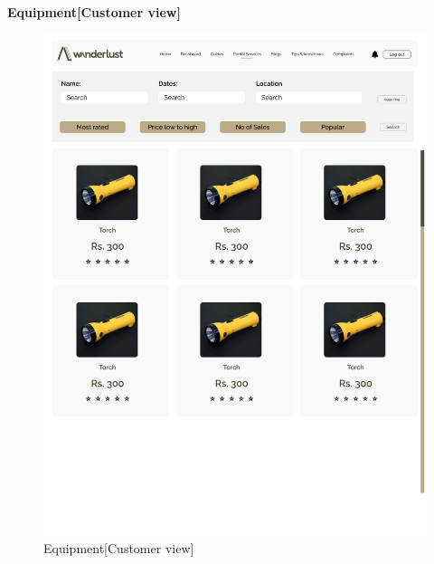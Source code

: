 \textbf{Equipment[Customer view]}\\
\begin{figure}[h!]
    \centering
    \includegraphics[width=1\textwidth]{Images/Wireframes/Customer Equipments srs.png}
    \caption{Equipment[Customer view]}
\end{figure}
\clearpage

